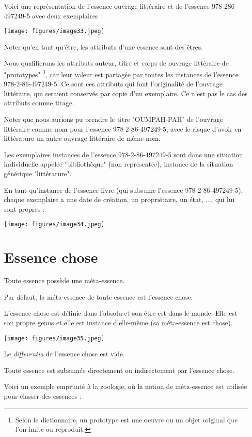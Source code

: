 \documentclass[a4paper, 12pt, openright, french]{book}
\begin{document}
Voici une représentation de l'essence ouvrage littéraire
et de l'essence 978-286-497249-5 avec deux exemplaires :

\texttt{[image: figures/image33.jpeg]}

Noter qu'en tant qu'être, les attributs d'une essence sont des êtres.

Nous qualifierons les attributs auteur, titre et corps de ouvrage
littéraire de "prototypes" \footnote{Selon le dictionnaire, un prototype est une oeuvre ou un objet original
que l'on imite ou reproduit.}, car leur valeur est partagée par toutes les
instances de l'essence 978-2-86-497249-5. Ce sont ces
attributs qui font l'originalité de
l'ouvrage littéraire, qui seraient conservés par copie
d'un exemplaire. Ce n'est pas le cas des
attributs comme tirage.

Noter que nous aurions pu prendre le titre "OUMPAH-PAH" de
l'ouvrage littéraire comme nom pour
l'essence 978-2-86-497249-5, avec le risque
d'avoir en littérature un autre ouvrage littéraire de
même nom.

Les exemplaires instances de l'essence 978-2-86-497249-5
sont dans une situation individuelle appelée "bibliothèque" (non
représentée), instance de la situation générique "littérature".

En tant qu'instance de l'essence livre
(qui subsume l'essence 978-2-86-497249-5), chaque
exemplaire a une date de création, un propriétaire, un état, ..., qui
lui sont propres :

\texttt{[image: figures/image34.jpeg]}

\section{Essence chose}

Toute essence possède une méta-essence.

Par défaut, la méta-essence de toute essence est
l'essence chose.

L'essence chose est définie dans
l'absolu et son être est dans le monde. Elle est son
propre genus et elle est instance d'elle-même (sa
méta-essence est chose).

\texttt{[image: figures/image35.jpeg]}

Le \emph{differentia} de l'essence chose est vide.

Toute essence est subsumée directement ou indirectement par
l'essence chose.

Voici un exemple emprunté à la zoologie, où la notion de méta-essence
est utilisée pour classer des essences :
\end{document}
